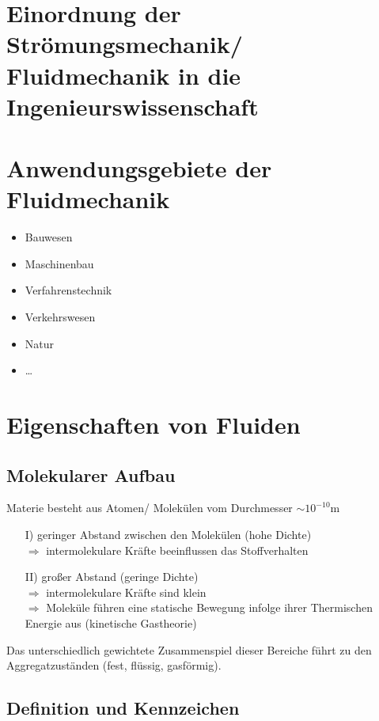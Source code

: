 \documentclass[10pt,a4paper]{article}
\begin{document}
\section{Einordnung der Strömungsmechanik/ Fluidmechanik in die Ingenieurswissenschaft}


\section{Anwendungsgebiete der Fluidmechanik}

\begin{itemize}
\item Bauwesen
\item Maschinenbau
\item Verfahrenstechnik
\item Verkehrswesen
\item Natur
\item \dots
\end{itemize}

\section{Eigenschaften von Fluiden}

\subsection{Molekularer Aufbau}

Materie besteht aus Atomen/ Molekülen vom Durchmesser $\sim 10^{-10} \text{m}$ \\
\begin{itemize}
\item[I)] geringer Abstand zwischen den Molekülen (hohe Dichte) \\
$\Rightarrow$ intermolekulare Kräfte beeinflussen das Stoffverhalten
\item[II)] großer Abstand (geringe Dichte) \\
$\Rightarrow$ intermolekulare Kräfte sind klein \\
$\Rightarrow$ Moleküle führen eine statische Bewegung infolge ihrer Thermischen Energie aus (kinetische Gastheorie)
\end{itemize}
Das unterschiedlich gewichtete Zusammenspiel dieser Bereiche führt zu den Aggregatzuständen (fest, flüssig, gasförmig).

\subsection{Definition und Kennzeichen}
\end{document}
